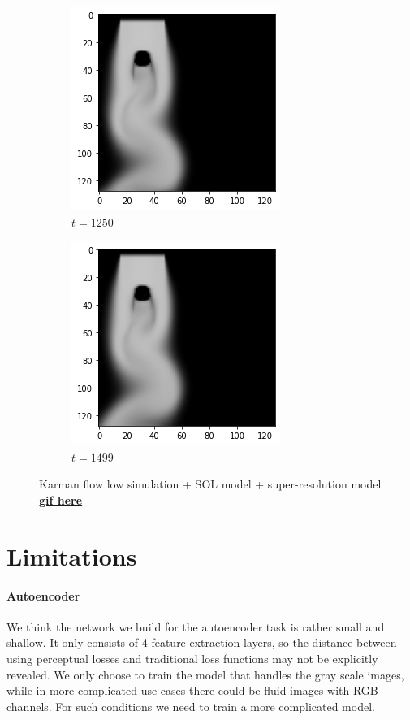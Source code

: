\documentclass[a4paper,12pt,twoside]{report}
\begin{document}
\begin{figure}
\begin{subfigure}{0.18\textwidth}
	\end{subfigure}
	\begin{subfigure}{0.18\textwidth}
		\centering
		\includegraphics[scale=0.3]{timecost/low1250.png}
		\caption{$t=1250$}
	\end{subfigure}
	\begin{subfigure}{0.18\textwidth}
		\centering
		\includegraphics[scale=0.3]{timecost/low1499.png}
		\caption{$t=1499$}
	\end{subfigure}
	\caption{Karman flow low simulation + SOL model + super-resolution model \href{https://github.com/w191444052/sol-data/blob/master/sol\%2Bsuperresolution/sol\%2Bsuperresolution_output.gif}{\textbf{gif here}}}
	\label{timecost out}
\end{figure}

\section{Limitations}
\paragraph{Autoencoder} We think the network we build for the autoencoder task is rather small and shallow. It only consists of 4 feature extraction layers, so the distance between using perceptual losses and traditional loss functions may not be explicitly revealed. We only choose to train the model that handles the gray scale images, while in more complicated use cases there could be fluid images with RGB channels. For such conditions we need to train a more complicated model.
\end{document}
